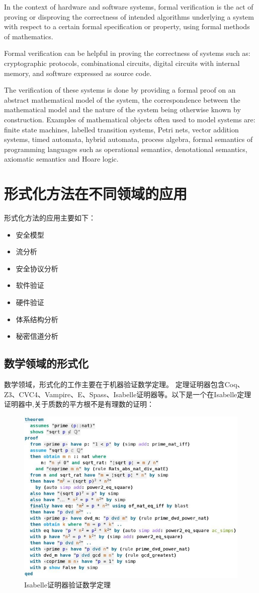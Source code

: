 \documentclass[cs4size,a4pape,UTF8]{ctexart}
\numberwithin{equation}{section}
\numberwithin{table}{section}
\numberwithin{figure}{section}
\begin{document}
In the context of hardware and software systems, formal verification is the act of proving or disproving the correctness of intended algorithms underlying a system with respect to a certain formal specification or property, using formal methods of mathematics.

Formal verification can be helpful in proving the correctness of systems such as: cryptographic protocols, combinational circuits, digital circuits with internal memory, and software expressed as source code.

The verification of these systems is done by providing a formal proof on an abstract mathematical model of the system, the correspondence between the mathematical model and the nature of the system being otherwise known by construction. Examples of mathematical objects often used to model systems are: finite state machines, labelled transition systems, Petri nets, vector addition systems, timed automata, hybrid automata, process algebra, formal semantics of programming languages such as operational semantics, denotational semantics, axiomatic semantics and Hoare logic.


\section{形式化方法在不同领域的应用}
形式化方法的应用主要如下：

\begin{itemize}
\item 安全模型
\item 流分析
\item 安全协议分析
\item 软件验证
\item 硬件验证
\item 体系结构分析
\item 秘密信道分析
\end{itemize}

\subsection{数学领域的形式化}
数学领域，形式化的工作主要在于机器验证数学定理。
定理证明器包含Coq、Z3、CVC4、Vampire、E、Spass、Isabelle证明器等。以下是一个在Isabelle定理证明器中,关于质数的平方根不是有理数的证明：

\begin{figure}[thbp!]
\centering
\includegraphics[width=0.6\linewidth]{figure/1}
\caption{Isabelle证明器验证数学定理}
\label{fig:1}
\end{figure}
 
\end{document}
